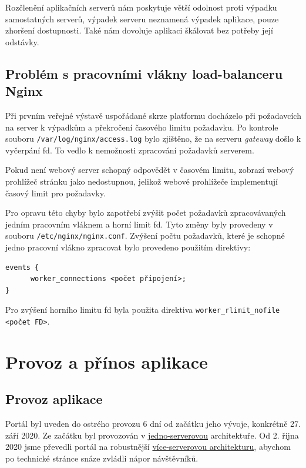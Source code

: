 Rozčlenění aplikačních serverů nám poskytuje větší odolnost proti výpadku samostatných serverů, výpadek serveru neznamená výpadek aplikace, pouze zhoršení dostupnosti.
Také nám dovoluje aplikaci škálovat bez potřeby její odstávky.

\subsection{Problém s pracovními vlákny load-balanceru Nginx}\label{sub:poor-nginx}

Při prvním veřejné výstavě uspořádané skrze platformu \bso{} docházelo při požadavcích na server k výpadkům a překročení časového limitu požadavku.
Po kontrole souboru \verb|/var/log/nginx/access.log| bylo zjištěno, že na serveru \textit{gateway} došlo k vyčerpání \acrshort{fd}.
To vedlo k nemožnosti zpracování požadavků serverem.

Pokud není webový server schopný odpovědět v časovém limitu, zobrazí webový prohlížeč stránku jako nedostupnou,
jelikož webové prohlížeče implementují časový limit pro požadavky\cite{browser-timeout}.

Pro opravu této chyby bylo zapotřebí zvýšit počet požadavků zpracovávaných jedním pracovním vláknem a horní limit \acrshort{fd}.
Tyto změny byly provedeny v souboru \verb|/etc/nginx/nginx.conf|.
Zvýšení počtu požadavků, které je schopné jedno pracovní vlákno zpracovat bylo provedeno použitím direktivy:
\begin{verbatim}
events {
      worker_connections <počet připojení>;
}
\end{verbatim}
Pro zvýšení horního limitu \acrshort{fd} byla použita direktiva \verb|worker_rlimit_nofile <počet FD>|.

\section{Provoz a přínos aplikace}

\subsection{Provoz aplikace}

Portál byl uveden do ostrého provozu 6 dní od začátku jeho vývoje, konkrétně 27. září 2020.
Ze začátku byl provozován v \hyperref[sub:one-server]{jedno-serverovou} architektuře.
Od 2. řijna 2020 jsme převedli portál na robustnější \hyperref[sub:multi-server]{více-serverovou architekturu},
abychom po technické stránce snáze zvládli nápor návštěvníků. 

